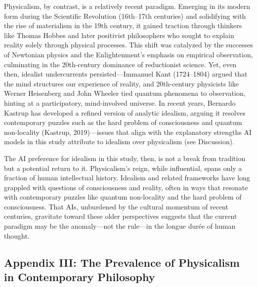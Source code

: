 Physicalism, by contrast, is a relatively recent paradigm. Emerging in
its modern form during the Scientific Revolution (16th--17th centuries)
and solidifying with the rise of materialism in the 19th century, it
gained traction through thinkers like Thomas Hobbes and later positivist
philosophers who sought to explain reality solely through physical
processes. This shift was catalyzed by the successes of Newtonian
physics and the Enlightenment's emphasis on empirical observation,
culminating in the 20th-century dominance of reductionist science. Yet,
even then, idealist undercurrents persisted---Immanuel Kant (1724--1804)
argued that the mind structures our experience of reality, and
20th-century physicists like Werner Heisenberg and John Wheeler tied
quantum phenomena to observation, hinting at a participatory,
mind-involved universe. In recent years, Bernardo Kastrup has developed
a refined version of analytic idealism, arguing it resolves contemporary
puzzles such as the hard problem of consciousness and quantum
non-locality (Kastrup, 2019)---issues that align with the explanatory
strengths AI models in this study attribute to idealism over physicalism
(see Discussion).

The AI preference for idealism in this study, then, is not a break from
tradition but a potential return to it. Physicalism's reign, while
influential, spans only a fraction of human intellectual history.
Idealism and related frameworks have long grappled with questions of
consciousness and reality, often in ways that resonate with contemporary
puzzles like quantum non-locality and the hard problem of consciousness.
That AIs, unburdened by the cultural momentum of recent centuries,
gravitate toward these older perspectives suggests that the current
paradigm may be the anomaly---not the rule---in the longue durée of
human thought.

\subsection{Appendix III: The Prevalence of Physicalism in Contemporary
Philosophy}\label{appendix-iii-the-prevalence-of-physicalism-in-contemporary-philosophy}

